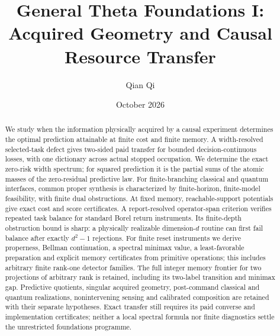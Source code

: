 
\title[Acquired geometry and causal resource transfer]{General Theta Foundations I:\\Acquired Geometry and Causal Resource Transfer}
\author{Qian Qi}\date{October 2026}

\begin{abstract}
We study when the information physically acquired by a causal experiment determines the optimal prediction attainable at finite cost and finite memory. A width-resolved selected-task defect gives two-sided paid transfer for bounded decision-continuous losses, with one dictionary across actual stopped occupation. We determine the exact zero-risk width spectrum; for squared prediction it is the partial sums of the atomic masses of the zero-residual predictive law. For finite-branching classical and quantum interfaces, common proper synthesis is characterized by finite-horizon, finite-model feasibility, with finite dual obstructions. At fixed memory, reachable-support potentials give exact cost and score certificates. A report-resolved operator-span criterion verifies repeated task balance for standard Borel return instruments. Its finite-depth obstruction bound is sharp: a physically realizable dimension-$d$ routine can first fail balance after exactly $d^2-1$ rejections. For finite reset instruments we derive properness, Bellman continuation, a spectral minimax value, a least-favorable preparation and explicit memory certificates from primitive operations; this includes arbitrary finite rank-one detector families. The full integer memory frontier for two projections of arbitrary rank is retained, including its two-label transition and minimax gap. Predictive quotients, singular acquired geometry, post-command classical and quantum realizations, nonintervening sensing and calibrated composition are retained with their separate hypotheses. Exact transfer still requires its paid converse and implementation certificates; neither a local spectral formula nor finite diagnostics settle the unrestricted foundations programme.
\end{abstract}
\maketitle
